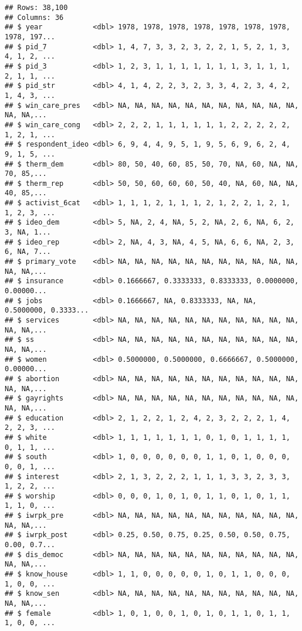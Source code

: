 \documentclass[
]{article}
\begin{document}
\begin{verbatim}
## Rows: 38,100
## Columns: 36
## $ year            <dbl> 1978, 1978, 1978, 1978, 1978, 1978, 1978, 1978, 197...
## $ pid_7           <dbl> 1, 4, 7, 3, 3, 2, 3, 2, 2, 1, 5, 2, 1, 3, 4, 1, 2, ...
## $ pid_3           <dbl> 1, 2, 3, 1, 1, 1, 1, 1, 1, 1, 3, 1, 1, 1, 2, 1, 1, ...
## $ pid_str         <dbl> 4, 1, 4, 2, 2, 3, 2, 3, 3, 4, 2, 3, 4, 2, 1, 4, 3, ...
## $ win_care_pres   <dbl> NA, NA, NA, NA, NA, NA, NA, NA, NA, NA, NA, NA, NA,...
## $ win_care_cong   <dbl> 2, 2, 2, 1, 1, 1, 1, 1, 1, 2, 2, 2, 2, 2, 1, 2, 1, ...
## $ respondent_ideo <dbl> 6, 9, 4, 4, 9, 5, 1, 9, 5, 6, 9, 6, 2, 4, 9, 1, 5, ...
## $ therm_dem       <dbl> 80, 50, 40, 60, 85, 50, 70, NA, 60, NA, NA, 70, 85,...
## $ therm_rep       <dbl> 50, 50, 60, 60, 60, 50, 40, NA, 60, NA, NA, 40, 85,...
## $ activist_6cat   <dbl> 1, 1, 1, 2, 1, 1, 1, 2, 1, 2, 2, 1, 2, 1, 1, 2, 3, ...
## $ ideo_dem        <dbl> 5, NA, 2, 4, NA, 5, 2, NA, 2, 6, NA, 6, 2, 3, NA, 1...
## $ ideo_rep        <dbl> 2, NA, 4, 3, NA, 4, 5, NA, 6, 6, NA, 2, 3, 6, NA, 7...
## $ primary_vote    <dbl> NA, NA, NA, NA, NA, NA, NA, NA, NA, NA, NA, NA, NA,...
## $ insurance       <dbl> 0.1666667, 0.3333333, 0.8333333, 0.0000000, 0.00000...
## $ jobs            <dbl> 0.1666667, NA, 0.8333333, NA, NA, 0.5000000, 0.3333...
## $ services        <dbl> NA, NA, NA, NA, NA, NA, NA, NA, NA, NA, NA, NA, NA,...
## $ ss              <dbl> NA, NA, NA, NA, NA, NA, NA, NA, NA, NA, NA, NA, NA,...
## $ women           <dbl> 0.5000000, 0.5000000, 0.6666667, 0.5000000, 0.00000...
## $ abortion        <dbl> NA, NA, NA, NA, NA, NA, NA, NA, NA, NA, NA, NA, NA,...
## $ gayrights       <dbl> NA, NA, NA, NA, NA, NA, NA, NA, NA, NA, NA, NA, NA,...
## $ education       <dbl> 2, 1, 2, 2, 1, 2, 4, 2, 3, 2, 2, 2, 1, 4, 2, 2, 3, ...
## $ white           <dbl> 1, 1, 1, 1, 1, 1, 1, 0, 1, 0, 1, 1, 1, 1, 0, 1, 1, ...
## $ south           <dbl> 1, 0, 0, 0, 0, 0, 0, 1, 1, 0, 1, 0, 0, 0, 0, 0, 1, ...
## $ interest        <dbl> 2, 1, 3, 2, 2, 2, 1, 1, 1, 3, 3, 2, 3, 3, 1, 2, 2, ...
## $ worship         <dbl> 0, 0, 0, 1, 0, 1, 0, 1, 1, 0, 1, 0, 1, 1, 1, 1, 0, ...
## $ iwrpk_pre       <dbl> NA, NA, NA, NA, NA, NA, NA, NA, NA, NA, NA, NA, NA,...
## $ iwrpk_post      <dbl> 0.25, 0.50, 0.75, 0.25, 0.50, 0.50, 0.75, 0.00, 0.7...
## $ dis_democ       <dbl> NA, NA, NA, NA, NA, NA, NA, NA, NA, NA, NA, NA, NA,...
## $ know_house      <dbl> 1, 1, 0, 0, 0, 0, 0, 1, 0, 1, 1, 0, 0, 0, 1, 0, 0, ...
## $ know_sen        <dbl> NA, NA, NA, NA, NA, NA, NA, NA, NA, NA, NA, NA, NA,...
## $ female          <dbl> 1, 0, 1, 0, 0, 1, 0, 1, 0, 1, 1, 0, 1, 1, 1, 0, 0, ...

\end{verbatim}
\end{document}
